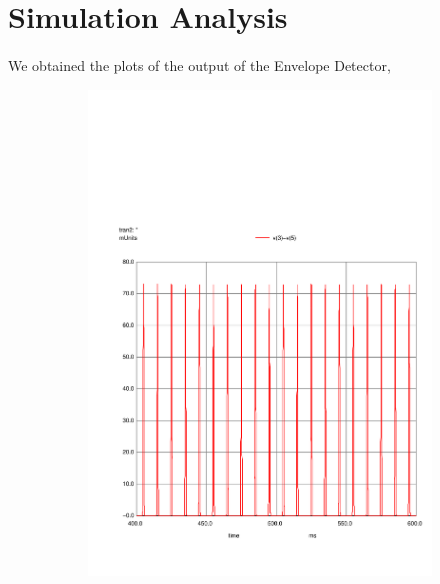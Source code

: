 \section{Simulation Analysis}
\label{sec:simulation}

\paragraph{} We obtained the plots of the output of the Envelope Detector,

\begin{figure}[h]
    \centering
    \begin{subfigure}{0.23\textwidth}
        \includegraphics[width=1.5\linewidth, clip]{../sim/envdect.pdf}
        \label{fig:PStime}
    \end{subfigure}
    \begin{subfigure}{0.23\textwidth}

\end{subfigure}
\end{figure}
